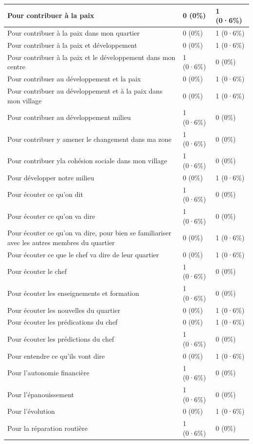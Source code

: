 \documentclass[
]{book}
\begin{document}
\begin{tabular}{l|l|l}
\hline
Pour contribuer à la paix & 0 (0\%) & 1 (0·6\%)\\
\hline
Pour contribuer à la paix dans mon quartier & 0 (0\%) & 1 (0·6\%)\\
\hline
Pour contribuer à la paix et développement & 0 (0\%) & 1 (0·6\%)\\
\hline
Pour contribuer à la paix et le développement dans mon centre & 1 (0·6\%) & 0 (0\%)\\
\hline
Pour contribuer au développement et  la paix & 0 (0\%) & 1 (0·6\%)\\
\hline
Pour contribuer au développement et à la paix dans mon village & 0 (0\%) & 1 (0·6\%)\\
\hline
Pour contribuer au développement milieu & 1 (0·6\%) & 0 (0\%)\\
\hline
Pour contribuer y amener le changement dans ma zone & 1 (0·6\%) & 0 (0\%)\\
\hline
Pour contribuer yla cohésion sociale dans mon village & 1 (0·6\%) & 0 (0\%)\\
\hline
Pour développer notre milieu & 0 (0\%) & 1 (0·6\%)\\
\hline
Pour écouter ce qu'on dit & 1 (0·6\%) & 0 (0\%)\\
\hline
Pour écouter ce qu'on va dire & 1 (0·6\%) & 0 (0\%)\\
\hline
Pour écouter ce qu'on va dire, pour bien se familiariser avec les autres membres du quartier & 0 (0\%) & 1 (0·6\%)\\
\hline
Pour écouter ce que le chef va dire de leur quartier & 0 (0\%) & 1 (0·6\%)\\
\hline
Pour écouter le chef & 1 (0·6\%) & 0 (0\%)\\
\hline
Pour écouter les enseignements et formation & 1 (0·6\%) & 0 (0\%)\\
\hline
Pour écouter les nouvelles du quartier & 0 (0\%) & 1 (0·6\%)\\
\hline
Pour écouter les prédications du chef & 0 (0\%) & 1 (0·6\%)\\
\hline
Pour écouter les prédictions du chef & 1 (0·6\%) & 0 (0\%)\\
\hline
Pour entendre ce qu'ils vont dire & 0 (0\%) & 1 (0·6\%)\\
\hline
Pour l'autonomie financière & 1 (0·6\%) & 0 (0\%)\\
\hline
Pour l'épanouissement & 1 (0·6\%) & 0 (0\%)\\
\hline
Pour l'évolution & 0 (0\%) & 1 (0·6\%)\\
\hline
Pour la réparation routière & 1 (0·6\%) & 0 (0\%)\\

\end{tabular}
\end{document}
